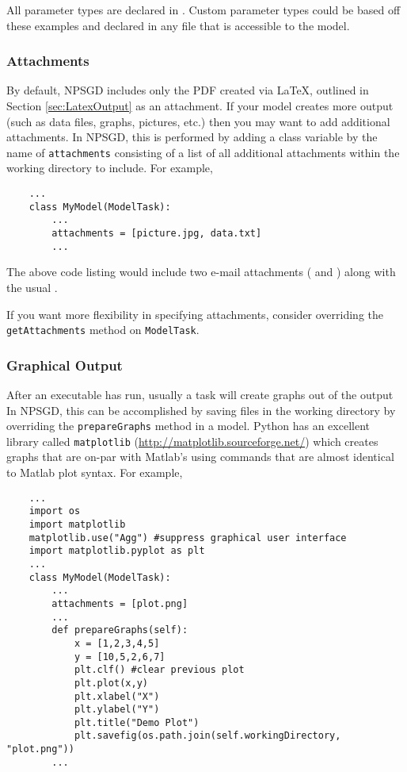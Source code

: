 \documentclass{article}
\begin{document}
All parameter types are declared in . Custom
parameter types could be based off these examples and declared in any file that
is accessible to the model.

\subsubsection{Attachments}
\label{sec:attachments}
By default, NPSGD includes only the PDF created via \LaTeX, outlined in Section
\ref{sec:LatexOutput} as an attachment. If your model creates more output (such
as data files, graphs, pictures, etc.) then you may want to add additional
attachments. In NPSGD, this is performed by adding a class variable by the name
of \texttt{attachments} consisting of a list of all additional attachments
within the working directory to include. For example,
\begin{lstlisting}
    ...
    class MyModel(ModelTask):
        ...
        attachments = [picture.jpg, data.txt]
        ...
\end{lstlisting}
The above code listing would include two e-mail attachments (
and ) along with the usual .

If you want more flexibility in specifying attachments, consider overriding the
\texttt{getAttachments} method on \texttt{ModelTask}.

\subsubsection{Graphical Output}
After an executable has run, usually a task will create graphs out of the output
In NPSGD, this can be accomplished by saving files in the working
directory by overriding the \texttt{prepareGraphs} method in a model. Python has
an excellent library called \texttt{matplotlib}
(\url{http://matplotlib.sourceforge.net/}) which creates graphs that are on-par
with Matlab's using commands that are almost identical to Matlab plot syntax.
For example,
\begin{lstlisting}
    ...
    import os
    import matplotlib
    matplotlib.use("Agg") #suppress graphical user interface
    import matplotlib.pyplot as plt
    ...
    class MyModel(ModelTask):
        ...
        attachments = [plot.png]
        ...
        def prepareGraphs(self):
            x = [1,2,3,4,5]
            y = [10,5,2,6,7]
            plt.clf() #clear previous plot
            plt.plot(x,y)
            plt.xlabel("X")
            plt.ylabel("Y")
            plt.title("Demo Plot")
            plt.savefig(os.path.join(self.workingDirectory, "plot.png"))
        ...
\end{lstlisting}
\end{document}
